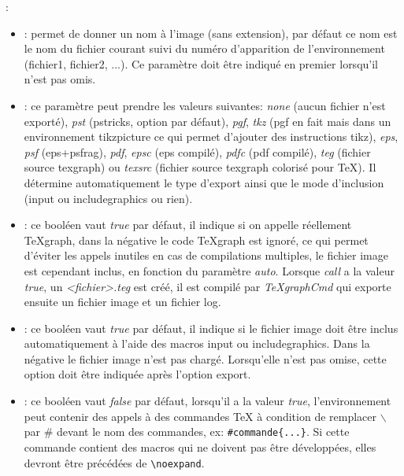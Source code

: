 :

\begin{itemize}
 \item {}: permet de donner un nom à l'image (sans extension), par défaut ce nom est le nom du fichier courant suivi du numéro d'apparition de l'environnement (fichier1, fichier2, ...). Ce paramètre doit être indiqué en premier lorsqu'il n'est pas omis.

 \item {}: ce paramètre peut prendre les valeurs suivantes: \textit{none} (aucun fichier n'est exporté), \textit{pst} (pstricks, option par défaut), \textit{pgf}, \textit{tkz} (pgf en fait mais dans un environnement tikzpicture ce qui permet d'ajouter des instructions tikz), \textit{eps}, \textit{psf} (eps+psfrag), \textit{pdf}, \textit{epsc} (eps compilé), \textit{pdfc} (pdf compilé), \textit{teg} (fichier source texgraph) ou \textit{texsrc} (fichier source texgraph colorisé pour \TeX). Il détermine automatiquement le type d'export ainsi que le mode d'inclusion (input ou includegraphics ou rien).

 \item {}:  ce booléen vaut \textit{true} par défaut, il indique si on appelle réellement TeXgraph, dans la négative le code TeXgraph est ignoré, ce qui permet d'éviter les appels inutiles en cas de compilations multiples, le fichier image est cependant inclus, en fonction du paramètre \textit{auto}. Lorsque \textit{call} a la valeur \textit{true}, un \textit{<fichier>.teg} est créé, il est compilé par \textit{TeXgraphCmd} qui exporte ensuite un fichier image et un fichier log.

 \item {}: ce booléen vaut \textit{true} par défaut, il indique si le fichier image doit être inclus automatiquement à l'aide des macros input ou includegraphics. Dans la négative le fichier image n'est pas chargé. Lorsqu'elle n'est pas omise, cette option doit être indiquée après l'option export.

 \item {}: ce booléen vaut \textit{false} par défaut, lorsqu'il a la valeur \textit{true},  l'environnement peut contenir des appels à des commandes \TeX{} à condition de remplacer $\backslash$ par \# devant le nom des commandes, ex: \verb|#commande{...}|. Si cette commande contient des macros qui ne doivent pas être développées,  elles devront être précédées de \verb|\noexpand|.


\end{itemize}

